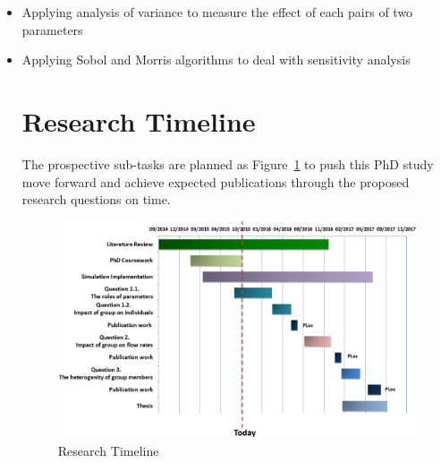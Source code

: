 \documentclass[a4paper,11pt,phdthesis,singlespace,twoside]{cssethesis}
\begin{document}
\begin{itemize}
	\item Applying analysis of variance to measure the effect of each pairs of two parameters
	\item Applying Sobol and Morris algorithms to deal with sensitivity analysis

\section{Research Timeline}

The prospective sub-tasks are planned as Figure~\ref{fig:research_timeline} to push this PhD study move forward and achieve expected publications through the proposed research questions on time.
\begin{figure}[H]
\begin{center}
\includegraphics[width=0.8\columnwidth]{figs/research_timeline.png}
\end{center}
\caption{Research Timeline}
\label{fig:research_timeline}
\end{figure}


\end{itemize}
\end{document}
